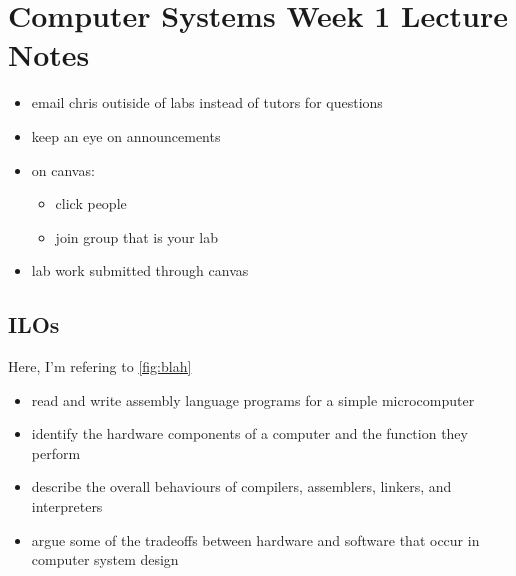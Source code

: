 \documentclass[12pt]{scrartcl}
\begin{document}
\section*{Computer Systems Week 1 Lecture Notes}

\begin{itemize}
    \item email chris outiside of labs instead of tutors for questions
    \item keep an eye on announcements
    \item on canvas:
    \begin{itemize}
        \item click people
        \item join group that is your lab
    \end{itemize}
    \item lab work submitted through canvas
\end{itemize}

\subsection*{ILOs}
Here, I'm refering to \ref{fig:blah}

\begin{itemize}
    \item read and write assembly language programs for a simple microcomputer
    \item identify the hardware components of a computer and the function they perform
    \item describe the overall behaviours of compilers, assemblers, linkers, and interpreters
    \item argue some of the tradeoffs between hardware and software that occur in computer system design
\end{itemize}
\end{document}
